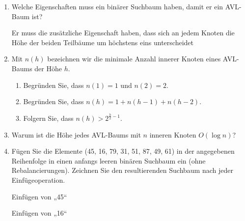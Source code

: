 \documentclass{bschlangaul-aufgabe}
\begin{document}
\begin{enumerate}

\item Welche Eigenschaften muss ein binärer Suchbaum haben, damit er ein
AVL-Baum ist?

\begin{bAntwort}
Er muss die zusätzliche Eigenschaft haben, dass sich an jedem Knoten die
Höhe der beiden Teilbäume um höchstens eins unterscheidet
\end{bAntwort}

\item Mit $n(h)$ bezeichnen wir die minimale Anzahl innerer Knoten eines
AVL-Baums der Höhe $h$.

\begin{enumerate}


\item Begründen Sie, dass $n(1) = 1$ und $n(2) = 2$.


\item Begründen Sie, dass $n(h) = 1 + n(h - 1) + n (h - 2)$.


\item Folgern Sie, dass $n(h) > 2^{\frac{h}{2}-1}$.
\end{enumerate}

\item Warum ist die Höhe jedes AVL-Baums mit $n$ inneren Knoten $O(\log n)$?

\item Fügen Sie die Elemente (45, 16, 79, 31, 51, 87, 49, 61) in der
angegebenen Reihenfolge in einen anfangs leeren binären Suchbaum ein
(ohne Rebalancierungen). Zeichnen Sie den resultierenden Suchbaum nach
jeder Einfügeoperation.

\begin{bAntwort}
\begin{multicols}{2}
\begin{bBaum}{Einfügen von „45“}
\end{bBaum}

\begin{bBaum}{Einfügen von „16“}
\end{bBaum}


\end{multicols}
\end{bAntwort}
\end{enumerate}
\end{document}
